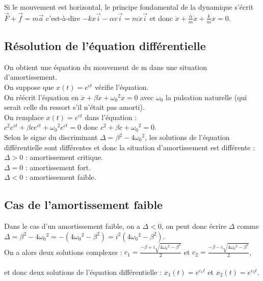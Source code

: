 \documentclass[a4paper,10pt]{book}
\begin{document}
Si le mouvement est horizontal, le principe fondamental de la dynamique s'écrit $\vec{F}+\vec{f}=m\vec{a}$ c'est-à-dire $-kx\vec{i}-\alpha v \vec{i}=m\ddot{x} \vec{i}$ et donc $\ddot{x}+\frac{\alpha}{m}\dot{x}+\frac{k}{m}x=0$.

\subsection{Résolution de l'équation différentielle}
On obtient une équation du mouvement de m dans une situation d'amortissement.\\
On suppose que $x(t)=e^{ct}$ vérifie l'équation.\\

On réécrit l'équation en $\ddot{x}+\beta \dot{x}+\omega_{0}{}^{2}x=0$ avec $\omega_{0}$ la pulsation naturelle (qui serait celle du ressort s'il n'était pas amorti).\\

On remplace $x(t)=e^{ct}$ dans l'équation :\\
$c^{2}e^{ct}+\beta ce^{ct}+\omega_{0}{}^{2}e^{ct}=0$ donc $c^{2}+\beta c+\omega_{0}{}^{2}=0$.\\

Selon le signe du discriminant $\Delta=\beta^{2}-4\omega_{0}{}^{2}$, les solutions de l'équation différentielle sont différentes et donc la situation d'amortissement est différente :\\

$\Delta>0$ : amortissement critique.\\

$\Delta=0$ : amortissement fort.\\

$\Delta<0$ : amortissement faible.

\subsection{Cas de l'amortissement faible}
Dans le cas d'un amortissement faible, on a $\Delta<0$, on peut donc écrire $\Delta$ comme\\
$\Delta=\beta^{2}-4\omega_{0}{}^{2}=-(4\omega_{0}{}^{2}-\beta^{2})=i^{2}(4\omega_{0}{}^{2}-\beta^{2})$.\\

On a alors deux solutions complexes : $c_{1}=\frac{-\beta+i\sqrt{4\omega_{0}{}^{2}-\beta^{2}}}{2}$ et $c_{2}=\frac{-\beta-i\sqrt{4\omega_{0}{}^{2}-\beta^{2}}}{2}$,\\\\
et donc deux solutions de l'équation différentielle : $x_{1}(t)=e^{c_{1}t}$ et $x_{2}(t)=e^{c_{2}t}$.\\\\
\end{document}
